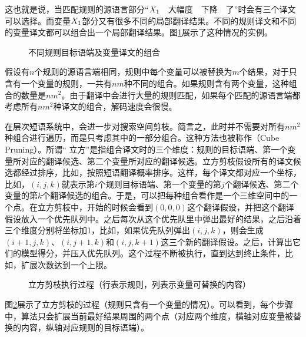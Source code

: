 \parinterval 这也就是说，当匹配规则的源语言部分“${X}_1$\ \ 大幅度\ \ 下降\ \ 了”时会有三个译文可以选择。而变量${X}_1$部分又有很多不同的局部翻译结果。不同的规则译文和不同的变量译文都可以组合出一个局部翻译结果。图\ref{fig:8-12}展示了这种情况的实例。

\begin{figure}[htp]
\centering

\caption{不同规则目标语端及变量译文的组合}
\label{fig:8-12}
\end{figure}

\parinterval 假设有$n$个规则的源语言端相同，规则中每个变量可以被替换为$m$个结果，对于只含有一个变量的规则，一共有$nm$种不同的组合。如果规则含有两个变量，这种组合的数量是$n{m}^2$。由于翻译中会进行大量的规则匹配，如果每个匹配的源语言端都考虑所有$n{m}^2$种译文的组合，解码速度会很慢。

\parinterval 在层次短语系统中，会进一步对搜索空间剪枝。简言之，此时并不需要对所有$n{m}^2$种组合进行遍历，而是只考虑其中的一部分组合。这种方法也被称作{\small{}}（Cube Pruning）。所谓“ 立方”是指组合译文时的三个维度：规则的目标语端、第一个变量所对应的翻译候选、第二个变量所对应的翻译候选。立方剪枝假设所有的译文候选都经过排序，比如，按照短语翻译概率排序。这样，每个译文都对应一个坐标，比如，$(i,j,k)$就表示第$i$个规则目标语端、第一个变量的第$j$个翻译候选、第二个变量的第$k$个翻译候选的组合。于是，可以把每种组合看作是一个三维空间中的一个点。在立方剪枝中，开始的时候会看到$(0,0,0)$这个翻译假设，并把这个翻译假设放入一个优先队列中。之后每次从这个优先队里中弹出最好的结果，之后沿着三个维度分别将坐标加1，比如，如果优先队列弹出$(i,j,k)$，则会生成$(i+1,j,k)$、$(i,j+1,k)$和$(i,j,k+1)$这三个新的翻译假设。之后，计算出它们的模型得分，并压入优先队列。这个过程不断被执行，直到达到终止条件，比如，扩展次数达到一个上限。

\begin{figure}[htp]
\centering

\caption{立方剪枝执行过程（行表示规则，列表示变量可替换的内容）}
\label{fig:8-13}
\end{figure}

\parinterval 图\ref{fig:8-13}展示了立方剪枝的过程（规则只含有一个变量的情况）。可以看到，每个步骤中，算法只会扩展当前最好结果周围的两个点（对应两个维度，横轴对应变量被替换的内容，纵轴对应规则的目标语端）。

